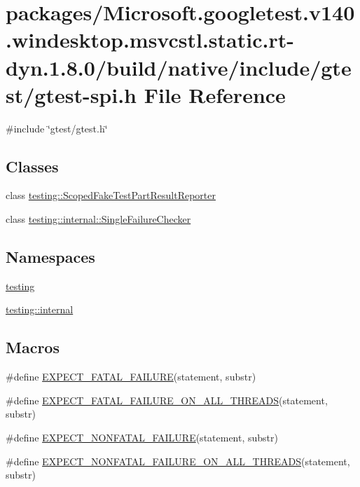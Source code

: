 \hypertarget{gtest-spi_8h}{}\section{packages/\+Microsoft.googletest.\+v140.\+windesktop.\+msvcstl.\+static.\+rt-\/dyn.1.8.0/build/native/include/gtest/gtest-\/spi.h File Reference}
\label{gtest-spi_8h}
{\ttfamily \#include \char`\"{}gtest/gtest.\+h\char`\"{}}\newline
\subsection*{Classes}
\begin{DoxyCompactItemize}
\item 
class \mbox{\hyperlink{classtesting_1_1_scoped_fake_test_part_result_reporter}{testing\+::\+Scoped\+Fake\+Test\+Part\+Result\+Reporter}}
\item 
class \mbox{\hyperlink{classtesting_1_1internal_1_1_single_failure_checker}{testing\+::internal\+::\+Single\+Failure\+Checker}}
\end{DoxyCompactItemize}
\subsection*{Namespaces}
\begin{DoxyCompactItemize}
\item 
 \mbox{\hyperlink{namespacetesting}{testing}}
\item 
 \mbox{\hyperlink{namespacetesting_1_1internal}{testing\+::internal}}
\end{DoxyCompactItemize}
\subsection*{Macros}
\begin{DoxyCompactItemize}
\item 
\#define \mbox{\hyperlink{gtest-spi_8h_a819a3fd7f8b8cf24b6f1b3a26708973d}{E\+X\+P\+E\+C\+T\+\_\+\+F\+A\+T\+A\+L\+\_\+\+F\+A\+I\+L\+U\+RE}}(statement,  substr)
\item 
\#define \mbox{\hyperlink{gtest-spi_8h_ad8aac5bc859b2ddc07583636ae4f45cf}{E\+X\+P\+E\+C\+T\+\_\+\+F\+A\+T\+A\+L\+\_\+\+F\+A\+I\+L\+U\+R\+E\+\_\+\+O\+N\+\_\+\+A\+L\+L\+\_\+\+T\+H\+R\+E\+A\+DS}}(statement,  substr)
\item 
\#define \mbox{\hyperlink{gtest-spi_8h_a8376fd6821bd88fd806697355e79e138}{E\+X\+P\+E\+C\+T\+\_\+\+N\+O\+N\+F\+A\+T\+A\+L\+\_\+\+F\+A\+I\+L\+U\+RE}}(statement,  substr)
\item 
\#define \mbox{\hyperlink{gtest-spi_8h_a9f4cf1f150fe9facfc4cbf0bae646ee9}{E\+X\+P\+E\+C\+T\+\_\+\+N\+O\+N\+F\+A\+T\+A\+L\+\_\+\+F\+A\+I\+L\+U\+R\+E\+\_\+\+O\+N\+\_\+\+A\+L\+L\+\_\+\+T\+H\+R\+E\+A\+DS}}(statement,  substr)
\end{DoxyCompactItemize}


